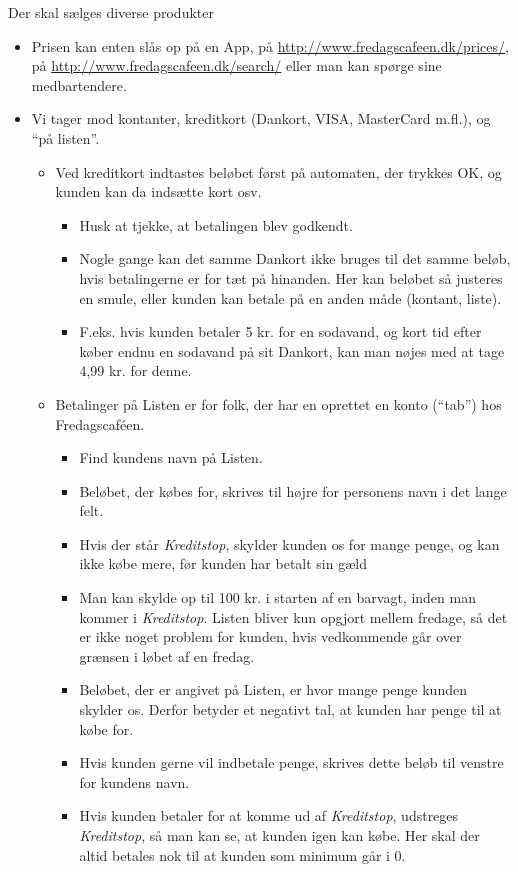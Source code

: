 Der skal sælges diverse produkter
\begin{itemize}
\item Prisen kan enten slås op på en App, på
  \url{http://www.fredagscafeen.dk/prices/}, på \url{http://www.fredagscafeen.dk/search/} eller man kan spørge
  sine medbartendere.
\item Vi tager mod kontanter, kreditkort (Dankort, VISA, MasterCard
  m.fl.), og ``på listen''.
  \begin{itemize}
  \item Ved kreditkort indtastes beløbet først på automaten, der
    trykkes OK, og kunden kan da indsætte kort osv.
    \begin{itemize}
    \item Husk at tjekke, at betalingen blev godkendt.
    \item Nogle gange kan det samme Dankort ikke bruges til det samme
      beløb, hvis betalingerne er for tæt på hinanden. Her kan beløbet
      så justeres en smule, eller kunden kan betale på en anden måde
      (kontant, liste).
    \item F.eks. hvis kunden betaler 5 kr. for en sodavand, og kort
      tid efter køber endnu en sodavand på sit Dankort, kan man nøjes
      med at tage 4,99 kr. for denne.
    \end{itemize}
  \item Betalinger på Listen er for folk, der har en oprettet en konto
    (``tab'') hos Fredagscaféen.
    \begin{itemize}
    \item Find kundens navn på Listen.
    \item Beløbet, der købes for, skrives til højre for personens navn
      i det lange felt.
    \item Hvis der står \emph{Kreditstop}, skylder kunden os for mange
      penge, og kan ikke købe mere, før kunden har betalt sin gæld
    \item Man kan skylde op til 100 kr. i starten af en barvagt, inden
      man kommer i \emph{Kreditstop}. Listen bliver kun opgjort mellem
      fredage, så det er ikke noget problem for kunden, hvis
      vedkommende går over grænsen i løbet af en fredag.
    \item Beløbet, der er angivet på Listen, er hvor mange penge
      kunden skylder os. Derfor betyder et negativt tal, at kunden har
      penge til at købe for.
    \item Hvis kunden gerne vil indbetale penge, skrives dette beløb
      til venstre for kundens navn.
    \item Hvis kunden betaler for at komme ud af \emph{Kreditstop},
      udstreges \emph{Kreditstop}, så man kan se, at kunden igen kan
      købe. Her skal der altid betales nok til at kunden som minimum går i 0.
    \end{itemize}
  \end{itemize}
\end{itemize}

